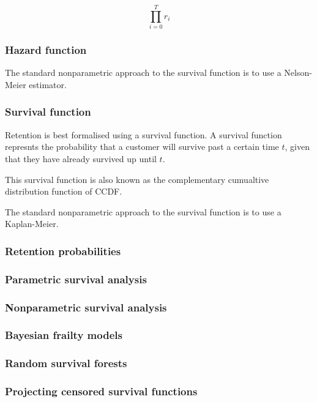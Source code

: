 \documentclass{article}
\begin{document}
$$\prod_{i=0}^{T} r_i $$


\subsubsection{Hazard function}

The standard nonparametric approach to the survival function is to use a Nelson-Meier estimator.


\subsubsection{Survival function}

Retention is best formalised using a survival function. A survival function represnts the probability that a customer will survive past a certain time $t$, given that they have already survived up until $t$.

This survival function is also known as the complementary cumualtive distribution function of CCDF.

The standard nonparametric approach to the survival function is to use a Kaplan-Meier.


\subsubsection{Retention probabilities}

\subsubsection{Parametric survival analysis}

\subsubsection{Nonparametric survival analysis}

\subsubsection{Bayesian frailty models}

\subsubsection{Random survival forests}

\subsubsection{Projecting censored survival functions}
\end{document}
